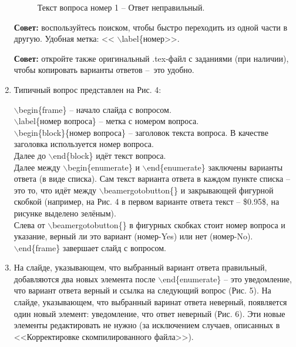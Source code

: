 \documentclass[11pt, a4paper]{extarticle}
\newcommand{\code}[1]{{\color{blue} #1}}
\newcommand{\form}[1]{{\color{magenta} #1}}
\begin{document}
\begin{enumerate}
	\begin{figure}[h!]
	\centering
	\caption{Текст вопроса номер 1 – Ответ неправильный.}
	\end{figure}

	\textbf{Совет:} воспользуйтесь поиском, чтобы быстро переходить из одной части в другую. Удобная метка: <<\form{$\backslash$label\{номер}>>.
	
	\textbf{Совет:} откройте также оригинальный \form{.tex}-файл с заданиями (при наличии), чтобы копировать варианты ответов – это удобно.
	
	\item Типичный вопрос представлен на Рис. 4:
	
	\code{$\backslash$begin\{frame\}} – начало слайда с вопросом. \\
	\code{$\backslash$label\{номер вопроса\}} – метка с номером вопроса. \\
	\code{$\backslash$begin\{block\}\{номер вопроса\}} – заголовок текста вопроса. В качестве заголовка используется номер вопроса. \\
	Далее до \code{$\backslash$end\{block\}} идёт текст вопроса. \\
	Далее между \code{$\backslash$begin\{enumerate\}} и \code{$\backslash$end\{enumerate\}} заключены варианты ответа (в виде списка). Сам текст варианта ответа в каждом пункте списка – это то, что идёт между \code{$\backslash$beamergotobutton\{\}} и закрывающей фигурной скобкой (например, на Рис. 4 в первом варианте ответа текст – \code{\$0.95\$}, на рисунке выделено зелёным). \\
	Слева от \code{$\backslash$beamergotobutton\{\}} в фигурных скобках стоит номер вопроса и указание, верный ли это вариант \code{(номер-Yes)} или нет \code{(номер-No)}. \\
	\code{$\backslash$end\{frame\}} завершает слайд с вопросом.
	
	\item На слайде, указывающем, что выбранный вариант ответа правильный, добавляются два новых элемента после \code{$\backslash$end\{enumerate\}} – это уведомление, что вариант ответа верный и ссылка на следующий вопрос (Рис. 5). На слайде, указывающем, что выбранный варинат ответа неверный, появляется один новый элемент: уведомление, что ответ неверный (Рис. 6). Эти новые элементы редактировать не нужно (за исключением случаев, описанных в <<Корректировке скомпилированного файла>>).
	

\end{enumerate}
\end{document}
